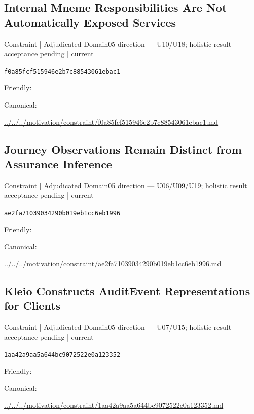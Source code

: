 \documentclass[10pt,a4paper]{article}
\begin{document}
\subsection*{Internal Mneme Responsibilities Are Not Automatically Exposed Services}
{\small Constraint | Adjudicated Domain05 direction — U10/U18; holistic result acceptance pending | current}\par
\texttt{f0a85fcf515946e2b7c88543061ebac1}\par
Friendly: \par
Canonical: \par
{\footnotesize\url{../../../motivation/constraint/f0a85fcf515946e2b7c88543061ebac1.md}}\par
\subsection*{Journey Observations Remain Distinct from Assurance Inference}
{\small Constraint | Adjudicated Domain05 direction — U06/U09/U19; holistic result acceptance pending | current}\par
\texttt{ae2fa71039034290b019eb1cc6eb1996}\par
Friendly: \par
Canonical: \par
{\footnotesize\url{../../../motivation/constraint/ae2fa71039034290b019eb1cc6eb1996.md}}\par
\subsection*{Kleio Constructs AuditEvent Representations for Clients}
{\small Constraint | Adjudicated Domain05 direction — U07/U15; holistic result acceptance pending | current}\par
\texttt{1aa42a9aa5a644bc9072522e0a123352}\par
Friendly: \par
Canonical: \par
{\footnotesize\url{../../../motivation/constraint/1aa42a9aa5a644bc9072522e0a123352.md}}\par
\end{document}
